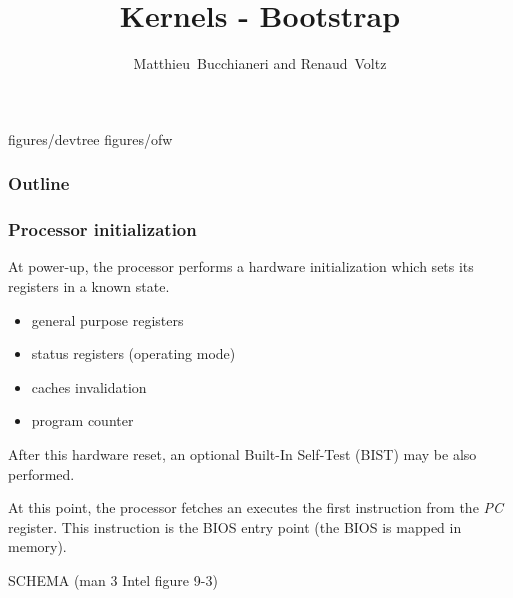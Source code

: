 
%
%



%
%

\title{Kernels - Bootstrap}

%
%

\author
{
  Matthieu~Bucchianeri and Renaud~Voltz
}

%
%

%


		{figures/devtree}
		{figures/ofw}

%
%



%
%

\begin{frame}
  \titlepage

  \begin{center}
    \logos
  \end{center}
\end{frame}

%
%

\begin{frame}
  \frametitle{Outline}
  \tableofcontents
\end{frame}

%
%

\begin{frame}
  \frametitle{Processor initialization}

  At power-up, the processor performs a hardware initialization which sets its registers in a known state.

  \-

  \begin{itemize}
  \item general purpose registers
  \item status registers (operating mode)
  \item caches invalidation
  \item program counter
  \end{itemize}

  \-

  After this hardware reset, an optional Built-In Self-Test (BIST) may be also performed.

  \-

  At this point, the processor fetches an executes the first instruction from the {\em PC} register. This instruction is the BIOS entry point (the BIOS is mapped in memory).

  \-

  SCHEMA (man 3 Intel figure 9-3)

\end{frame}

